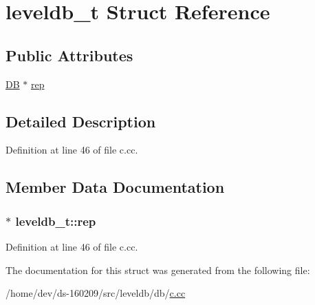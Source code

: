 \hypertarget{structleveldb__t}{}\section{leveldb\+\_\+t Struct Reference}
\label{structleveldb__t}
\subsection*{Public Attributes}
\begin{DoxyCompactItemize}
\item 
\hyperlink{classleveldb_1_1_d_b}{D\+B} $\ast$ \hyperlink{structleveldb__t_af8f1950b2c676ccc37e4095f558261ad}{rep}
\end{DoxyCompactItemize}


\subsection{Detailed Description}


Definition at line 46 of file c.\+cc.



\subsection{Member Data Documentation}
\hypertarget{structleveldb__t_af8f1950b2c676ccc37e4095f558261ad}{}
\subsubsection[{rep}]{$\ast$ leveldb\+\_\+t\+::rep}\label{structleveldb__t_af8f1950b2c676ccc37e4095f558261ad}


Definition at line 46 of file c.\+cc.



The documentation for this struct was generated from the following file\+:\begin{DoxyCompactItemize}
\item 
/home/dev/ds-\/160209/src/leveldb/db/\hyperlink{c_8cc}{c.\+cc}\end{DoxyCompactItemize}
